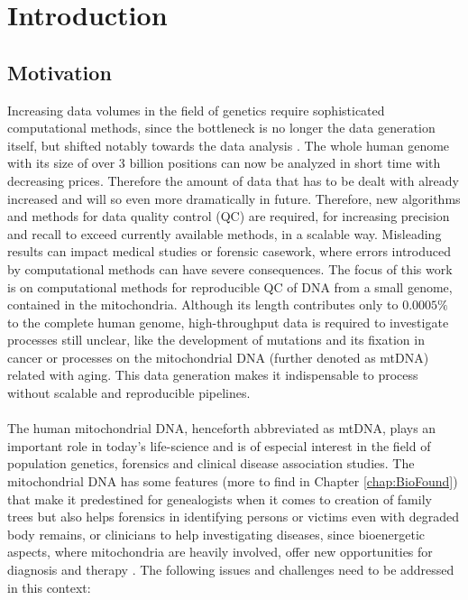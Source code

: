 \chapter{Introduction}
\label{chapterIntro}
\section{Motivation}
Increasing data volumes in the field of genetics require sophisticated computational methods, since the bottleneck is no longer the data generation itself, but shifted notably towards the data analysis \cite{Forer2016}. The whole human genome with its size of over 3 billion positions can now be analyzed in short time with decreasing prices. Therefore the amount of data that has to be dealt with already increased and will so even more dramatically in future. Therefore, new algorithms and methods for data quality control (QC) are required, for increasing precision and recall to exceed currently available methods, in a scalable way. Misleading results can impact medical studies or forensic casework, where errors introduced by computational methods can have severe consequences. The focus of this work is on computational methods for reproducible QC of DNA from a small genome, contained in the mitochondria. Although its length contributes only to $0.0005\%$ to the complete human genome, high-throughput data is required to investigate processes still unclear, like the development of mutations and its fixation in cancer or processes on the mitochondrial DNA (further denoted as mtDNA) related with aging. This data generation makes it indispensable to process without scalable and reproducible pipelines. 
\\
\\
The human mitochondrial DNA, henceforth abbreviated as mtDNA, plays an important role in today's life-science and is of especial interest in the field of population genetics, forensics and clinical disease association studies. The mitochondrial DNA has some features (more to find in Chapter \ref{chap:BioFound}) that make it predestined for genealogists when it comes to creation of family trees but also helps forensics in identifying persons or victims even with degraded body remains, or clinicians to help investigating diseases, since bioenergetic aspects, where mitochondria are heavily involved, offer new opportunities for diagnosis and therapy \cite{Picard2016}.
The following issues and challenges need to be addressed in this context:
